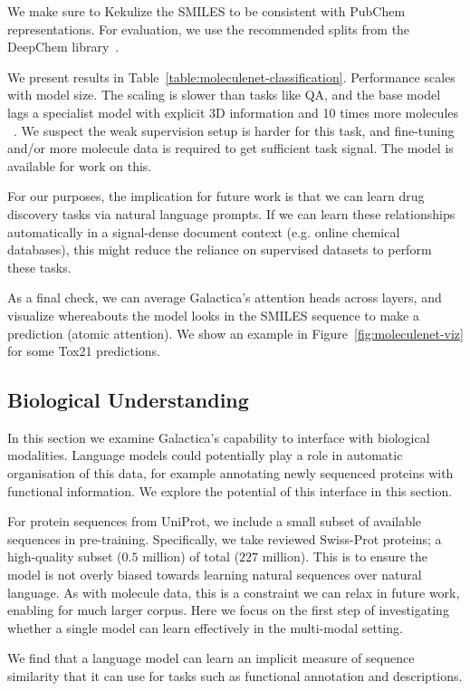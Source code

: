 {We make sure to Kekulize the SMILES to be consistent with PubChem representations. For evaluation, we use the recommended splits from the DeepChem library~\citep{Ramsundaretal}. 

We present results in Table~\ref{table:moleculenet-classification}. Performance scales with model size. The scaling is slower than tasks like QA, and the base model lags a specialist model with explicit 3D information and 10 times more molecules ~\citep{UniMol}. We suspect the weak supervision setup is harder for this task, and fine-tuning and/or more molecule data is required to get sufficient task signal. The model is available for work on this. 

For our purposes, the implication for future work is that we can learn drug discovery tasks via natural language prompts. If we can learn these relationships automatically in a signal-dense document context (e.g. online chemical databases), this might reduce the reliance on supervised datasets to perform these tasks.

As a final check, we can average Galactica's attention heads across layers, and visualize whereabouts the model looks in the SMILES sequence to make a prediction (atomic attention). We show an example in Figure~\ref{fig:moleculenet-viz} for some Tox21 predictions.

\subsection{Biological Understanding}

In this section we examine Galactica's capability to interface with biological modalities. Language models could potentially play a role in automatic organisation of this data, for example annotating newly sequenced proteins with functional information. We explore the potential of this interface in this section.

For protein sequences from UniProt, we include a small subset of available sequences in pre-training. Specifically,  we take reviewed Swiss-Prot proteins; a high-quality subset ($0.5$ million) of total ($227$ million). This is to ensure the model is not overly biased towards learning natural sequences over natural language. As with molecule data, this is a constraint we can relax in future work, enabling for much larger corpus. Here we focus on the first step of investigating whether a single model can learn effectively in the multi-modal setting.

We find that a language model can learn an implicit measure of sequence similarity that it can use for tasks such as functional annotation and descriptions.

}
